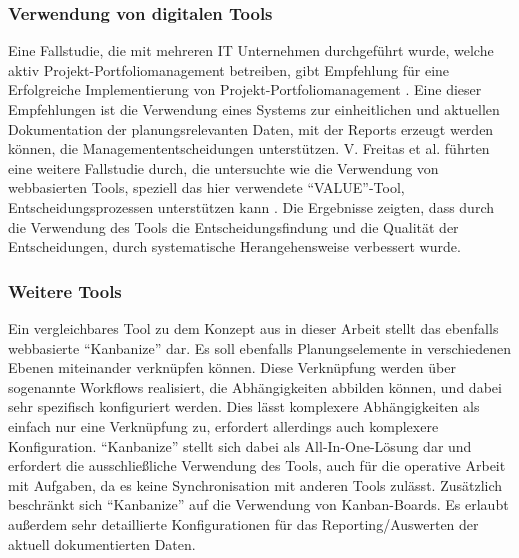 \subsubsection{Verwendung von digitalen Tools}
Eine Fallstudie, die mit mehreren IT Unternehmen durchgeführt wurde, welche aktiv Projekt-Portfoliomanagement betreiben, gibt Empfehlung für eine Erfolgreiche Implementierung von Projekt-Portfoliomanagement \cite{guidelinesForPortfoliomanagement}.
Eine dieser Empfehlungen ist die Verwendung eines Systems zur einheitlichen und aktuellen Dokumentation der planungsrelevanten Daten, mit der Reports erzeugt werden können, die Managemententscheidungen unterstützen.
V. Freitas et al. führten eine weitere Fallstudie durch, die untersuchte wie die Verwendung von webbasierten Tools, speziell das hier verwendete ``VALUE''-Tool, Entscheidungsprozessen unterstützen kann \cite{Value-Based-Decision-Making-Case-Study}. Die Ergebnisse zeigten, dass durch die Verwendung des Tools die Entscheidungsfindung und die Qualität der Entscheidungen, durch systematische Herangehensweise verbessert wurde.

\subsubsection{Weitere Tools}
Ein vergleichbares Tool zu dem Konzept aus in dieser Arbeit stellt das ebenfalls webbasierte ``Kanbanize'' dar. Es soll ebenfalls Planungselemente in verschiedenen Ebenen miteinander verknüpfen können. Diese Verknüpfung werden über sogenannte Workflows realisiert, die Abhängigkeiten abbilden können, und dabei sehr spezifisch konfiguriert werden. Dies lässt komplexere Abhängigkeiten als einfach nur eine Verknüpfung zu, erfordert allerdings auch komplexere Konfiguration. ``Kanbanize'' stellt sich dabei als All-In-One-Lösung dar und erfordert die ausschließliche Verwendung des Tools, auch für die operative Arbeit mit Aufgaben, da es keine Synchronisation mit anderen Tools zulässt. Zusätzlich beschränkt sich ``Kanbanize'' auf die Verwendung von Kanban-Boards. Es erlaubt außerdem sehr detaillierte Konfigurationen für das Reporting/Auswerten der aktuell dokumentierten Daten.
